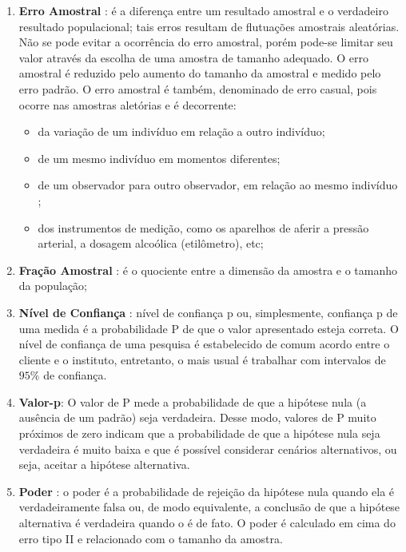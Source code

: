 \begin{enumerate}
\item \textbf{Erro Amostral} : é a diferença entre um resultado amostral e o verdadeiro resultado populacional; tais erros resultam de flutuações amostrais aleatórias. Não se pode evitar a ocorrência do erro amostral, porém pode-se limitar seu valor através da escolha de uma amostra de tamanho adequado. O erro amostral é reduzido pelo aumento do tamanho da amostral e medido pelo erro padrão. O erro amostral é também, denominado de erro casual, pois ocorre nas amostras aletórias e é decorrente:

\begin{itemize}
\item da variação de um indivíduo em relação a outro indivíduo;
\item de um mesmo indivíduo em momentos diferentes;
\item de um observador para outro observador, em relação ao mesmo indivíduo ;
\item dos instrumentos de medição, como os aparelhos de aferir a pressão arterial, a dosagem alcoólica (etilômetro), etc;
\end{itemize}


\item \textbf{Fração Amostral} : é o quociente entre a dimensão da amostra e o tamanho da população; 
\item \textbf{Nível de Confiança} : nível de confiança p ou, simplesmente, confiança p de uma medida é a probabilidade P de que o valor apresentado esteja correta. O nível de confiança de uma pesquisa é estabelecido de comum acordo entre o cliente e o instituto, entretanto, o mais usual é trabalhar com intervalos de $95\%$ de confiança.

\item \textbf{Valor-p}: O valor de P mede a probabilidade de que a hipótese nula (a ausência de um padrão) seja verdadeira. Desse modo, valores de P muito próximos de zero indicam que a probabilidade de que a hipótese nula seja verdadeira é muito baixa e que é possível considerar cenários alternativos, ou seja, aceitar a hipótese alternativa.
\item \textbf{Poder} : o poder é a probabilidade de rejeição da hipótese nula quando ela é verdadeiramente falsa ou, de modo equivalente, a conclusão de que a hipótese alternativa é verdadeira quando o é de fato. O poder é calculado em cima do erro tipo II e relacionado com o tamanho da amostra.
\end{enumerate}

